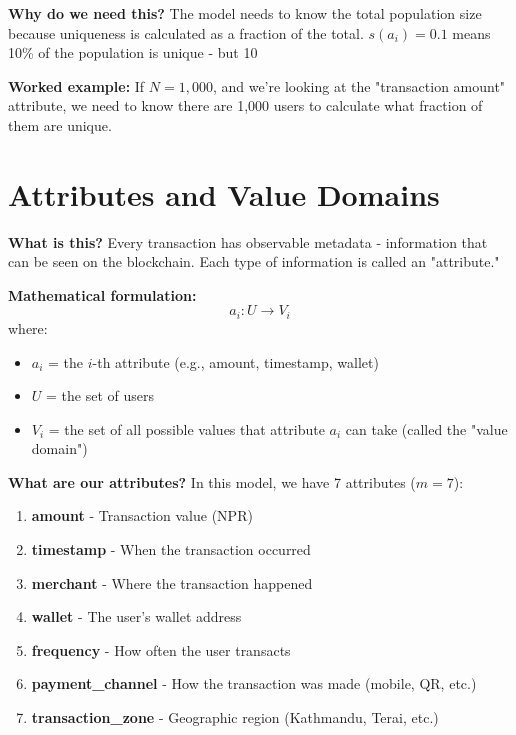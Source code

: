 \documentclass[12pt,a4paper,oneside,openany]{report}
\begin{document}
\textbf{Why do we need this?} The model needs to know the total population size because uniqueness is calculated as a fraction of the total. $s(a_i) = 0.1$ means 10\% of the population is unique - but 10%

\textbf{Worked example:} If $N = 1,000$, and we're looking at the "transaction amount" attribute, we need to know there are 1,000 users to calculate what fraction of them are unique.

\section{Attributes and Value Domains}
\label{sec:attributes}

\textbf{What is this?} Every transaction has observable metadata - information that can be seen on the blockchain. Each type of information is called an "attribute."

\textbf{Mathematical formulation:}
\begin{equation}
a_i : U \rightarrow V_i
\end{equation}
where:
\begin{itemize}
    \item $a_i$ = the $i$-th attribute (e.g., amount, timestamp, wallet)
    \item $U$ = the set of users
    \item $V_i$ = the set of all possible values that attribute $a_i$ can take (called the "value domain")
\end{itemize}

\textbf{What are our attributes?} In this model, we have 7 attributes ($m = 7$):
\begin{enumerate}
    \item \textbf{amount} - Transaction value (NPR)
    \item \textbf{timestamp} - When the transaction occurred
    \item \textbf{merchant} - Where the transaction happened
    \item \textbf{wallet} - The user's wallet address
    \item \textbf{frequency} - How often the user transacts
    \item \textbf{payment\_channel} - How the transaction was made (mobile, QR, etc.)
    \item \textbf{transaction\_zone} - Geographic region (Kathmandu, Terai, etc.)
\end{enumerate}
\end{document}
